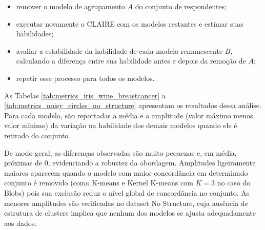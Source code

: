 \begin{itemize}
    \item[1] remover o modelo de agrupamento $A$ do conjunto de respondentes;
    
    \item[2] executar novamente o \gls{CLAIRE} com os modelos restantes e estimar suas habilidades;
    
    \item[3] avaliar a estabilidade da habilidade de cada modelo remanescente $B$, calculando a diferença entre sua habilidade antes e depois da remoção de $A$;
    
    \item[4] repetir esse processo para todos os modelos.
\end{itemize}

As Tabelas \ref{tab:metrics_iris_wine_breastcancer} a \ref{tab:metrics_noisy_circles_no_structure} apresentam os resultados dessa análise. Para cada modelo, são reportadas a média e a amplitude (valor máximo menos valor mínimo) da variação na habilidade dos demais modelos quando ele é retirado do conjunto.

De modo geral, as diferenças observadas são muito pequenas e, em média, próximas de $0$, evidenciando a robustez da abordagem. Amplitudes ligeiramente maiores aparecem quando o modelo com maior concordância em determinado conjunto é removido  (como K-means e Kernel K-means com $K=3$ no caso do Blobs) pois sua exclusão reduz o nível global de concordância no conjunto. As menores amplitudes são verificadas no dataset No Structure, cuja ausência de estrutura de clusters implica que nenhum dos modelos se ajusta adequadamente aos dados.

